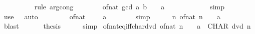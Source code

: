 \begin{isabellebody}
\ \ \ \ \ \ \ \ \isamarkupfalse%
\ {\isacharparenleft}{\kern0pt}rule\ arg{\isacharunderscore}{\kern0pt}cong{\isacharparenright}{\kern0pt}\isanewline
\ \ \ \ \ \ \isamarkupfalse%
\ {\isachardoublequoteopen}of{\isacharunderscore}{\kern0pt}nat\ {\isacharparenleft}{\kern0pt}gcd\ a\ b{\isacharparenright}{\kern0pt}\ {\isacharequal}{\kern0pt}\ {\isacharparenleft}{\kern0pt}{}\ {\isacharcolon}{\kern0pt}{\isacharcolon}{\kern0pt}\ {\isacharprime}{\kern0pt}a{\isacharparenright}{\kern0pt}{\isachardoublequoteclose}\isanewline
\ \ \ \ \ \ \ \ \isamarkupfalse%
\ {\isacharasterisk}{\kern0pt}\ \isamarkupfalse%
\ simp\isanewline
\ \ \ \ \isamarkupfalse%
\ {\isacharparenleft}{\kern0pt}use\ {\isacharasterisk}{\kern0pt}\ \ auto{\isacharparenright}{\kern0pt}\isanewline
\ \ \isamarkupfalse%
\isanewline
\ \ \ \ \isamarkupfalse%
\ {\isachardoublequoteopen}of{\isacharunderscore}{\kern0pt}nat\ {}\ {\isacharequal}{\kern0pt}\ {\isacharparenleft}{\kern0pt}{}\ {\isacharcolon}{\kern0pt}{\isacharcolon}{\kern0pt}\ {\isacharprime}{\kern0pt}a{\isacharparenright}{\kern0pt}{\isachardoublequoteclose}\isanewline
\ \ \ \ \ \ \isamarkupfalse%
\ simp\isanewline
\ \ \ \ \isamarkupfalse%
\ {\isachardoublequoteopen}{\isacharbraceleft}{\kern0pt}n{\isachardot}{\kern0pt}\ of{\isacharunderscore}{\kern0pt}nat\ n\ {\isacharequal}{\kern0pt}\ {\isacharparenleft}{\kern0pt}{}\ {\isacharcolon}{\kern0pt}{\isacharcolon}{\kern0pt}\ {\isacharprime}{\kern0pt}a{\isacharparenright}{\kern0pt}{\isacharbraceright}{\kern0pt}\ {\isasymnoteq}\ {\isacharbraceleft}{\kern0pt}{\isacharbraceright}{\kern0pt}{\isachardoublequoteclose}\isanewline
\ \ \ \ \ \ \isamarkupfalse%
\ blast\isanewline
\ \ \isamarkupfalse%
\isanewline
\ \ \isamarkupfalse%
\ {\isacharquery}{\kern0pt}thesis\isanewline
\ \ \ \ \isamarkupfalse%
\ simp\isanewline
{}\isamarkupfalse%
%
\endisatagproof
{\isafoldproof}%
%
\isadelimproof
\isanewline
%
\endisadelimproof
\isanewline
{}\isamarkupfalse%
\ of{\isacharunderscore}{\kern0pt}nat{\isacharunderscore}{\kern0pt}eq{\isacharunderscore}{\kern0pt}{}{\isacharunderscore}{\kern0pt}iff{\isacharunderscore}{\kern0pt}char{\isacharunderscore}{\kern0pt}dvd{\isacharcolon}{\kern0pt}\ {\isachardoublequoteopen}of{\isacharunderscore}{\kern0pt}nat\ n\ {\isacharequal}{\kern0pt}\ {\isacharparenleft}{\kern0pt}{}\ {\isacharcolon}{\kern0pt}{\isacharcolon}{\kern0pt}\ {\isacharprime}{\kern0pt}a{\isacharparenright}{\kern0pt}\ {\isasymlongleftrightarrow}\ CHAR\ dvd\ n{\isachardoublequoteclose}\isanewline

\end{isabellebody}
